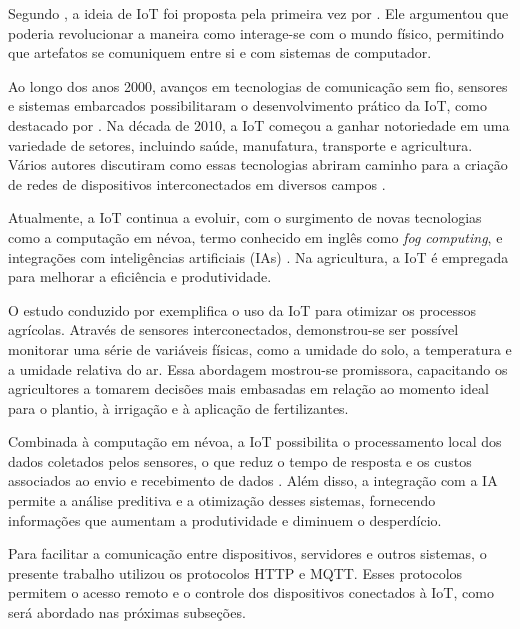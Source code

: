 Segundo \textcite{minerva2015towards}, a ideia de IoT foi proposta pela primeira vez por \textcite{ashton1999things}. Ele argumentou que poderia revolucionar a maneira como interage-se com o mundo físico, permitindo que artefatos se comuniquem entre si e com sistemas de computador.

Ao longo dos anos 2000, avanços em tecnologias de comunicação sem fio, sensores e sistemas embarcados possibilitaram o desenvolvimento prático da IoT, como destacado por \textcite{kortuem2009things}. Na década de 2010, a IoT começou a ganhar notoriedade em uma variedade de setores, incluindo saúde, manufatura, transporte e agricultura. Vários autores discutiram como essas tecnologias abriram caminho para a criação de redes de dispositivos interconectados em diversos campos \parencite{kortuem2009things, tan2010things, minerva2015towards}.

Atualmente, a IoT continua a evoluir, com o surgimento de novas tecnologias como a computação em névoa, termo conhecido em inglês como \textit{fog computing}, e integrações com inteligências artificiais (IAs) \parencite{junior2022data}. Na agricultura, a IoT é empregada para melhorar a eficiência e produtividade.

O estudo conduzido por \textcite{ferrandez2018precision} exemplifica o uso da IoT para otimizar os processos agrícolas. Através de sensores interconectados, demonstrou-se ser possível monitorar uma série de variáveis físicas, como a umidade do solo, a temperatura e a umidade relativa do ar. Essa abordagem mostrou-se promissora, capacitando os agricultores a tomarem decisões mais embasadas em relação ao momento ideal para o plantio, à irrigação e à aplicação de fertilizantes.

Combinada à computação em névoa, a IoT possibilita o processamento local dos dados coletados pelos sensores, o que reduz o tempo de resposta e os custos associados ao envio e recebimento de dados \parencite{hsu2020creative}. Além disso, a integração com a IA permite a análise preditiva e a otimização desses sistemas, fornecendo informações que aumentam a produtividade e diminuem o desperdício.

Para facilitar a comunicação entre dispositivos, servidores e outros sistemas, o presente trabalho utilizou os protocolos HTTP e MQTT. Esses protocolos permitem o acesso remoto e o controle dos dispositivos conectados à IoT, como será abordado nas próximas subseções.

